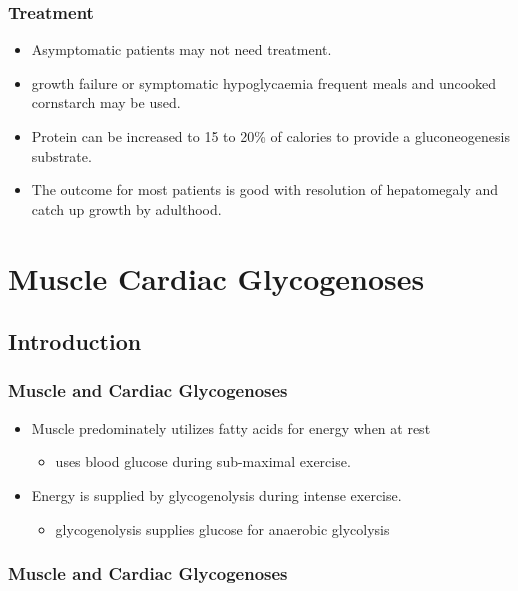 \documentclass{scrartcl}
\begin{document}
\subsubsection{Treatment}
\label{sec:org9dfcd6b}
\begin{itemize}
\item Asymptomatic patients may not need treatment.
\item growth failure or symptomatic hypoglycaemia frequent meals and
uncooked cornstarch may be used.
\item Protein can be increased to 15 to 20\% of calories to provide a gluconeogenesis substrate.
\item The outcome for most patients is good with resolution of
hepatomegaly and catch up growth by adulthood.
\end{itemize}

\section{Muscle Cardiac Glycogenoses}
\label{sec:orgb251871}
\subsection{Introduction}
\label{sec:org23d264a}
\subsubsection{Muscle and Cardiac Glycogenoses}
\label{sec:org0b7b92d}

\begin{itemize}
\item Muscle predominately utilizes fatty acids for energy when at rest
\begin{itemize}
\item uses blood glucose during sub-maximal exercise.
\end{itemize}
\item Energy is supplied by glycogenolysis during intense exercise.
\begin{itemize}
\item glycogenolysis supplies glucose for anaerobic glycolysis
\end{itemize}
\end{itemize}

\subsubsection{Muscle and Cardiac Glycogenoses}
\label{sec:orga09f113}
\end{document}
